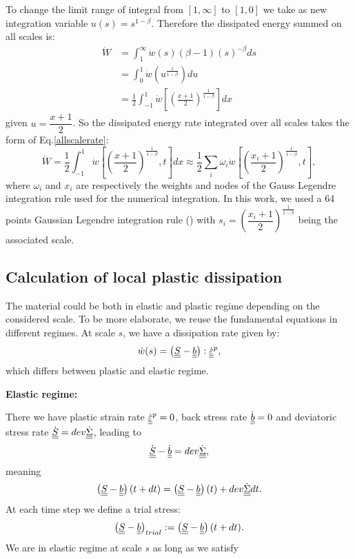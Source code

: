 \noindent
To change the limit range of integral from $[1,\infty]$ to $[1,0]$ we take as new integration variable
$u(s)= s^{1-\beta}$. Therefore the dissipated energy summed on all scales is:
\begin{equation}
\begin{split}
\dot{W}&=\int_{1}^{\infty}\dot{w}(s) (\beta-1)(s)^{-\beta}ds
\\&=\int_{0}^{1}\dot{w}\left( u^{\frac{1}{1-\beta}}\right)du
\\&=\frac{1}{2}\int_{-1}^{1}\dot{w}\left[  \left( \frac{x+1}{2}\right) ^{\frac{1}{1-\beta}}\right] dx
\end{split}
\label{allscale}
\end{equation}
given $u=\dfrac{x+1}{2}$. So the dissipated energy rate integrated over all scales takes the form of Eq.\eqref{allscalerate}:
\begin{equation}
\dot{W}=\frac{1}{2}\int_{-1}^{1}\dot{w}\left[  \left( \frac{x+1}{2}\right) ^{\frac{1}{1-\beta}},t\right] dx\approx\frac{1}{2}\sum_{i}\omega_i\dot{w}\left[  \left( \frac{x_i+1}{2}\right) ^{\frac{1}{1-\beta}},t\right],
\label{allscalerate}
\end{equation}
where $\omega_i$ and $x_i$ are respectively the weights and nodes of the Gauss Legendre integration rule used for the numerical integration.  In this work, we used a 64 points Gaussian Legendre integration rule (\cite{Legendre}) with $s_i=\left( \dfrac{x_i+1}{2}\right) ^{\frac{1}{1-\beta}}$ being the associated scale.

\subsection{Calculation of local plastic dissipation}
\label{sec:5.4.4}
The material could be both in elastic and plastic regime depending on the considered scale. To be more elaborate, we reuse the fundamental equations in different regimes. At scale $s$, we have a dissipation rate given by:
$$\dot{w}(s)=\left( \uline{\uline{S}}-\uline{\uline{b}}\right):\dot{\uline{\uline{\varepsilon}}}^p, $$
which differs between plastic and elastic regime.

\vspace{6pt}
\noindent
\textbf{Elastic regime:}

\vspace{6pt}
\noindent
There we have
plastic strain rate
$\dot{\uline{\uline{\varepsilon}}}^p=0$, back stress rate $\dot{\uline{\uline{b}}}=0$ and deviatoric stress rate $\dot{\uline{\uline{S}}}=dev\dot{\uline{\uline{\Sigma}}}$, leading to
$$\dot{\uline{\uline{S}}}-\dot{\uline{\uline{b}}}=dev\dot{\uline{\uline{\Sigma}}},$$ 
meaning
$$\left( \uline{\uline{S}}-\uline{\uline{b}}\right) (t+dt)=\left( \uline{\uline{S}}-\uline{\uline{b}}\right) (t)+dev\dot{\uline{\uline{\Sigma}}}dt.$$
At each time step we define a trial stress:
\begin{equation}
\left( \uline{\uline{S}}-\uline{\uline{b}}\right)_{trial}:=\left( \uline{\uline{S}}-\uline{\uline{b}}\right)(t+dt).
\label{trial}
\end{equation}
We are in elastic regime at scale $s$ as long as we satisfy

